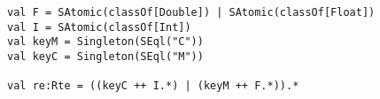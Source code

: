 \begin{lstlisting}[style=scalaioScala]
val F = SAtomic(classOf[Double]) | SAtomic(classOf[Float])
val I = SAtomic(classOf[Int])
val keyM = Singleton(SEql("C"))
val keyC = Singleton(SEql("M"))

val re:Rte = ((keyC ++ I.*) | (keyM ++ F.*)).*
\end{lstlisting}
